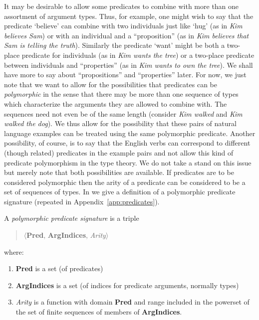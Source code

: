   

It may be desirable to allow some predicates to combine with more than
one assortment of argument types.  Thus, for example, one might wish
to say that the predicate `believe' can combine with two individuals
just like `hug' (as in \textit{Kim believes Sam}) or with an
individual and a ``proposition'' (as in \textit{Kim believes that Sam
  is telling the truth}).  Similarly the predicate `want' might be
both a two-place predicate for individuals (as in \textit{Kim wants
  the tree}) or a two-place predicate between individuals and
``properties'' (as in \textit{Kim wants to own the tree}).  We shall
have more to say about ``propositions'' and ``properties'' later.  For
now, we just note that we want to allow for the possibilities that
predicates can be \textit{polymorphic} in the sense that there may be
more than one sequence of types which characterize the arguments they
are allowed to combine with.  The sequences need not even be of the
same length (consider \textit{Kim walked} and \textit{Kim walked the
  dog}).  We thus allow for the possibility that these pairs of natural
language examples can be treated using the same polymorphic
predicate.  Another possibility, of course, is to say that the English
verbs can correspond to different (though related) predicates in the
example pairs and not allow this kind of predicate polymorphism in the
type theory. We do not take a stand on this issue but merely note that
both possibilities are available.  If predicates are to be considered
polymorphic then the arity of a predicate can be considered to be a
set of sequences of types.  In \nexteg{} we give a definition of
a polymorphic predicate signature (repeated in Appendix~\ref{app:predicates}).
\begin{ex} 
A \textit{polymorphic predicate signature} 
is a triple 
\begin{quote}
$\langle$\textbf{Pred}, \textbf{ArgIndices}, \textit{Arity}$\rangle$
\end{quote}
where:
\begin{enumerate} 
 
\item \textbf{Pred} is a set (of predicates)

\item \textbf{ArgIndices} is a set (of indices for predicate
  arguments, normally types)
 
\item \textit{Arity} is a function with domain \textbf{Pred} and range
  included in the powerset of the set of finite sequences of members
  of \textbf{ArgIndices}. 
 
\end{enumerate}
\label{ex:poly-pred-sig} 
\end{ex} 
